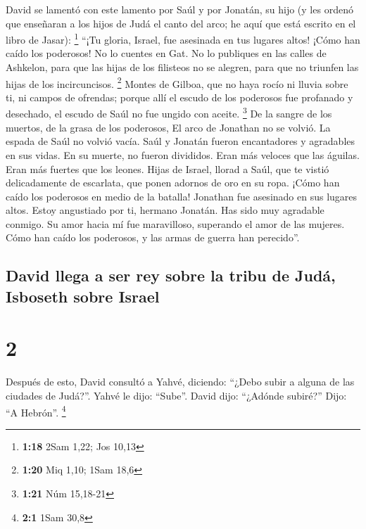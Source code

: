  David se lamentó con este lamento por Saúl y por
Jonatán, su hijo  (y les ordenó que enseñaran a los hijos
de Judá el canto del arco; he aquí que está escrito en el libro de
Jasar): \footnote{\textbf{1:18} 2Sam 1,22; Jos 10,13} 
``¡Tu gloria, Israel, fue asesinada en tus lugares altos! ¡Cómo han
caído los poderosos!  No lo cuentes en Gat. No lo
publiques en las calles de Ashkelon, para que las hijas de los filisteos
no se alegren, para que no triunfen las hijas de los incircuncisos.
\footnote{\textbf{1:20} Miq 1,10; 1Sam 18,6}  Montes de
Gilboa, que no haya rocío ni lluvia sobre ti, ni campos de ofrendas;
porque allí el escudo de los poderosos fue profanado y desechado, el
escudo de Saúl no fue ungido con aceite. \footnote{\textbf{1:21} Núm
  15,18-21}  De la sangre de los muertos, de la grasa de
los poderosos, El arco de Jonathan no se volvió. La espada de Saúl no
volvió vacía.  Saúl y Jonatán fueron encantadores y
agradables en sus vidas. En su muerte, no fueron divididos. Eran más
veloces que las águilas. Eran más fuertes que los leones.
 Hijas de Israel, llorad a Saúl, que te vistió
delicadamente de escarlata, que ponen adornos de oro en su ropa.
 ¡Cómo han caído los poderosos en medio de la batalla!
Jonathan fue asesinado en sus lugares altos.  Estoy
angustiado por ti, hermano Jonatán. Has sido muy agradable conmigo. Su
amor hacia mí fue maravilloso, superando el amor de las mujeres.
 Cómo han caído los poderosos, y las armas de guerra han
perecido''.

\hypertarget{david-llega-a-ser-rey-sobre-la-tribu-de-juduxe1-isboseth-sobre-israel}{%
\subsection{David llega a ser rey sobre la tribu de Judá, Isboseth sobre
Israel}\label{david-llega-a-ser-rey-sobre-la-tribu-de-juduxe1-isboseth-sobre-israel}}

\hypertarget{section-1}{%
\section{2}\label{section-1}}

 Después de esto, David consultó a Yahvé, diciendo:
``¿Debo subir a alguna de las ciudades de Judá?''. Yahvé le dijo:
``Sube''. David dijo: ``¿Adónde subiré?'' Dijo: ``A Hebrón''.
\footnote{\textbf{2:1} 1Sam 30,8}

